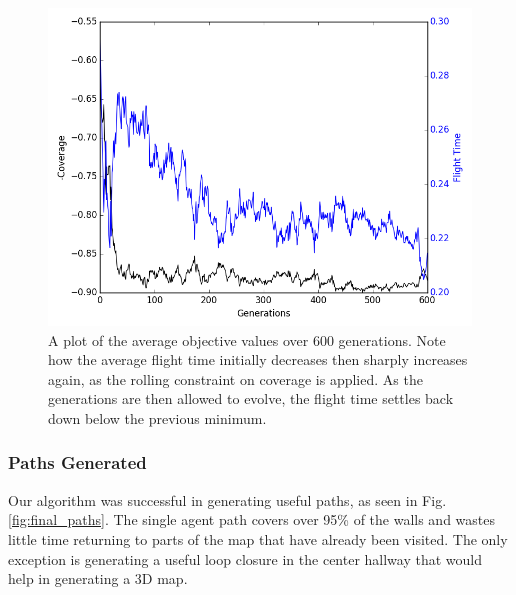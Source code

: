 \documentclass[letterpaper, 10 pt, conference]{ieeeconf}  %
\begin{document}
\begin{figure}
\centering
\includegraphics[width=1.0\linewidth]{fitness.png}
\caption[A plot of the average objective values over 600 generations for a single agent in the coverage planner optimization.]{A plot of the average objective values over 600 generations. Note how the average flight time initially decreases then sharply increases again, as the rolling constraint on coverage is applied. As the generations are then allowed to evolve, the flight time settles back down below the previous minimum.}
\label{fig:objectives}
\end{figure}

\subsubsection{Paths Generated}
Our algorithm was successful in generating useful paths, as seen in Fig. \ref{fig:final_paths}. The single agent path covers over 95\% of the walls and wastes little time returning to parts of the map that have already been visited. The only exception is generating a useful loop closure in the center hallway that would help in generating a 3D map.
\end{document}
